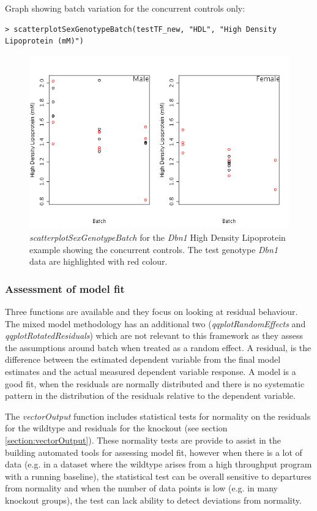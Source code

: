 \documentclass[12pt,a4paper]{article}
\begin{document}
Graph showing batch variation for the concurrent controls only:
\begingroup
\fontsize{8pt}{12pt}\selectfont
\begin{verbatim}
> scatterplotSexGenotypeBatch(testTF_new, "HDL", "High Density Lipoprotein (mM)")
\end{verbatim}
\endgroup 

\begin{figure}[H]%
\centerline{\includegraphics[scale=0.5]{cs_tf_4.png}}
\caption{\textit{scatterplotSexGenotypeBatch} for the \textit{Dbn1} High Density Lipoprotein example showing the concurrent controls. The test genotype \textit{Dbn1} data are highlighted with red colour.}\label{fig:cs_tf4}
\end{figure}

\subsubsection{Assessment of model fit}
Three functions are available and they focus on looking at residual behaviour. The mixed model methodology has an additional two (\textit{qqplotRandomEffects} and \textit{qqplotRotatedResiduals}) which are not relevant to this framework as they assess the assumptions around batch when treated as a random effect. A residual, is the difference between the estimated dependent variable from the final model estimates and the actual measured dependent variable response. A model is a good fit, when the residuals are normally distributed and there is no systematic pattern in the distribution of the residuals relative to the dependent variable.

The \textit{vectorOutput} function includes statistical tests for normality on the residuals for the wildtype and residuals for the knockout (see section \ref{section:vectorOutput}). These normality tests are provide to assist in the building automated tools for assessing model fit, however when there is a lot of data (e.g. in a dataset where the wildtype arises from a high throughput program with a running baseline), the statistical test can be overall sensitive to departures from normality and when the number of data points is low (e.g. in many knockout groups), the test can lack ability to detect deviations from normality.
\end{document}
